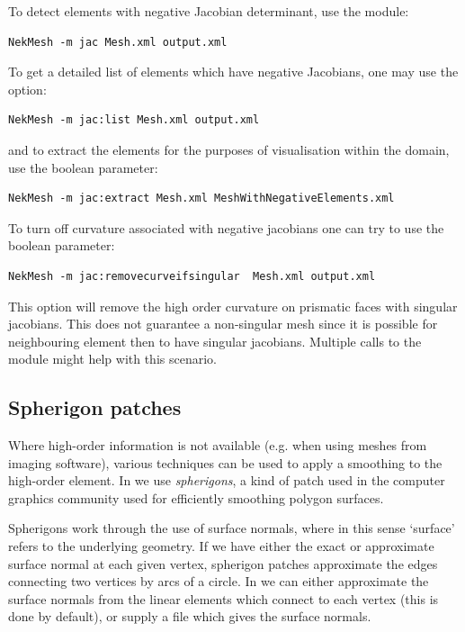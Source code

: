 To detect elements with negative Jacobian determinant, use the 
module:
%
\begin{lstlisting}[style=BashInputStyle]
NekMesh -m jac Mesh.xml output.xml
\end{lstlisting}
%
To get a detailed list of elements which have negative Jacobians, one may use
the  option:
%
\begin{lstlisting}[style=BashInputStyle]
NekMesh -m jac:list Mesh.xml output.xml
\end{lstlisting}
%
and to extract the elements for the purposes of visualisation within the domain,
use the  boolean parameter:
%
\begin{lstlisting}[style=BashInputStyle]
NekMesh -m jac:extract Mesh.xml MeshWithNegativeElements.xml
\end{lstlisting}

To turn off curvature associated with negative jacobians one can try to use the  boolean parameter:
\begin{lstlisting}[style=BashInputStyle]
NekMesh -m jac:removecurveifsingular  Mesh.xml output.xml
\end{lstlisting}
This option will remove the high order curvature on prismatic faces
with singular jacobians. This does not guarantee a non-singular mesh
since it is possible for neighbouring element then to have singular
jacobians. Multiple calls to the module might help with this scenario.

\subsection{Spherigon patches}

Where high-order information is not available (e.g. when using meshes from
imaging software), various techniques can be used to apply a smoothing to the
high-order element. In \mc we use \emph{spherigons}, a kind of patch used in the
computer graphics community used for efficiently smoothing polygon surfaces.

Spherigons work through the use of surface normals, where in this sense
`surface' refers to the underlying geometry. If we have either the exact or
approximate surface normal at each given vertex, spherigon patches approximate
the edges connecting two vertices by arcs of a circle. In \mc we can either
approximate the surface normals from the linear elements which connect to each
vertex (this is done by default), or supply a file which gives the surface
normals.

